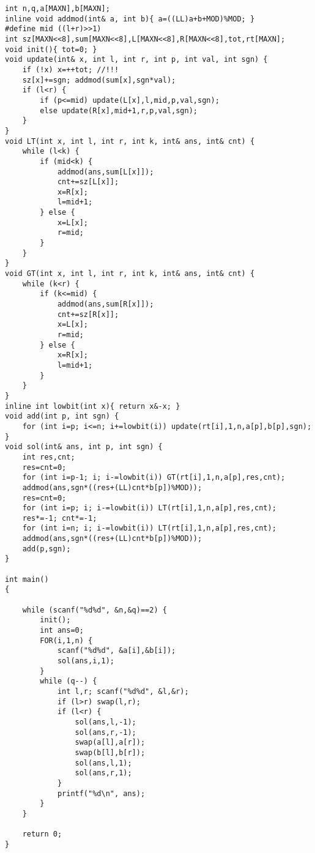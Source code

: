 \begin{lstlisting}
int n,q,a[MAXN],b[MAXN];
inline void addmod(int& a, int b){ a=((LL)a+b+MOD)%MOD; }
#define mid ((l+r)>>1)
int sz[MAXN<<8],sum[MAXN<<8],L[MAXN<<8],R[MAXN<<8],tot,rt[MAXN];
void init(){ tot=0; }
void update(int& x, int l, int r, int p, int val, int sgn) {
    if (!x) x=++tot; //!!!
    sz[x]+=sgn; addmod(sum[x],sgn*val);
    if (l<r) {
        if (p<=mid) update(L[x],l,mid,p,val,sgn);
        else update(R[x],mid+1,r,p,val,sgn);
    }
}
void LT(int x, int l, int r, int k, int& ans, int& cnt) {
    while (l<k) {
        if (mid<k) {
            addmod(ans,sum[L[x]]);
            cnt+=sz[L[x]];
            x=R[x];
            l=mid+1;
        } else {
            x=L[x];
            r=mid;
        }
    }
}
void GT(int x, int l, int r, int k, int& ans, int& cnt) {
    while (k<r) {
        if (k<=mid) {
            addmod(ans,sum[R[x]]);
            cnt+=sz[R[x]];
            x=L[x];
            r=mid;
        } else {
            x=R[x];
            l=mid+1;
        }
    }
}
inline int lowbit(int x){ return x&-x; }
void add(int p, int sgn) {
    for (int i=p; i<=n; i+=lowbit(i)) update(rt[i],1,n,a[p],b[p],sgn);
}
void sol(int& ans, int p, int sgn) {
    int res,cnt;
    res=cnt=0;
    for (int i=p-1; i; i-=lowbit(i)) GT(rt[i],1,n,a[p],res,cnt);
    addmod(ans,sgn*((res+(LL)cnt*b[p])%MOD));
    res=cnt=0;
    for (int i=p; i; i-=lowbit(i)) LT(rt[i],1,n,a[p],res,cnt);
    res*=-1; cnt*=-1;
    for (int i=n; i; i-=lowbit(i)) LT(rt[i],1,n,a[p],res,cnt);
    addmod(ans,sgn*((res+(LL)cnt*b[p])%MOD));
    add(p,sgn);
}

int main()
{

    while (scanf("%d%d", &n,&q)==2) {
        init();
        int ans=0;
        FOR(i,1,n) {
            scanf("%d%d", &a[i],&b[i]);
            sol(ans,i,1);
        }
        while (q--) {
            int l,r; scanf("%d%d", &l,&r);
            if (l>r) swap(l,r);
            if (l<r) {
                sol(ans,l,-1);
                sol(ans,r,-1);
                swap(a[l],a[r]);
                swap(b[l],b[r]);
                sol(ans,l,1);
                sol(ans,r,1);
            }
            printf("%d\n", ans);
        }
    }

    return 0;
}
\end{lstlisting}